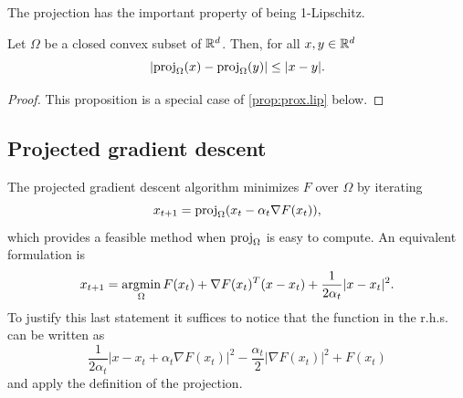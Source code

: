 The projection has the important property of being 1-Lipschitz.
\begin{proposition}
\label{prop:proj.lip}
Let $\Omega$ be a closed convex subset of ${\mathbb{R}}^d$. Then, for all $x,y\in {\mathbb{R}}^d$
\begin{equation}
\label{eq:proj.lip}
|\mathrm{proj}_\Omega(x) - \mathrm{proj}_\Omega(y)| \leq |x-y|.
\end{equation}
\end{proposition}
\begin{proof}
This proposition is a special case of \cref{prop:prox.lip} below.
\end{proof}


\subsection{Projected gradient descent}
\label{sec:proj.grad}
The projected gradient descent algorithm minimizes $F$ over $\Omega$ by iterating
\begin{equation}
\label{eq:proj.grad}
x_{t+1} = \mathrm{proj}_\Omega(x_t - \alpha_t \nabla F(x_t)),
\end{equation}
which provides a feasible method when $\mathrm{proj}_\Omega$ is easy to compute. An equivalent formulation is
\begin{equation}
\label{eq:proj.grad.2}
x_{t+1} = \operatorname*{argmin}_\Omega F(x_t) + \nabla F(x_t)^T (x-x_t) + \frac1{2\alpha_t} |x-x_t|^2.
\end{equation}
To justify this last statement it suffices to notice that the function in the r.h.s. can be written as
\[
\frac{1}{2\alpha_t} |x - x_t + \alpha_t \nabla F(x_t)|^2 - \frac{\alpha_t}{2} |\nabla F(x_t)|^2 + F(x_t)
\]
and apply the definition of the projection. 

